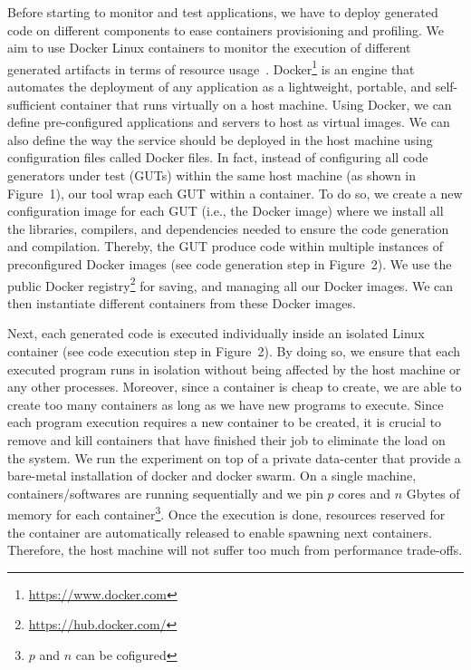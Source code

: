 Before starting to monitor and test applications, we have to deploy generated code on different components to ease containers provisioning and profiling. 
We aim to use Docker Linux containers to monitor the execution of different generated artifacts in terms of resource usage~\cite{merkel2014docker}. 
Docker\footnote{\url{https://www.docker.com}} is an engine that automates the deployment of any application as a lightweight, portable, and self-sufficient container that runs virtually on a host machine. 
Using Docker, we can define pre-configured applications and servers to host as virtual images. We can also define the way the service should be deployed in the host machine using configuration files called Docker files. 
In fact, instead of configuring all code generators under test (GUTs) within the same host machine (as shown in Figure~1), our tool wrap each GUT within a container. To do so, we create a new configuration image for each GUT (i.e., the Docker image) where we install all the libraries, compilers, and dependencies needed to ensure the code generation and compilation. Thereby, the GUT produce code within multiple instances of preconfigured Docker images (see code generation step in Figure~2).
We use the public Docker registry\footnote{\url{https://hub.docker.com/}} for  saving, and managing all our Docker images. 
We can then instantiate different containers from these Docker images. 

Next, each generated code is executed individually inside an isolated Linux container (see code execution step in Figure~2). By doing so, we ensure that each executed program runs in isolation without being affected by the host machine or any other processes. Moreover, since a container is cheap to create, we are able to create too many containers as long as we have new programs to execute.  
Since each program execution requires a new container to be created, it is crucial to remove and kill containers that have finished their job to eliminate the load on the system. We run the experiment on top of a private data-center that provide a bare-metal installation of  docker and docker swarm. On a single machine,  containers/softwares are running sequentially and we pin $p$ cores and $n$ Gbytes of memory for each container\footnote{$p$ and $n$ can be cofigured}. Once the execution is done, resources reserved for the container are automatically released to enable spawning next containers. Therefore, the host machine will not suffer too much from performance trade-offs.

